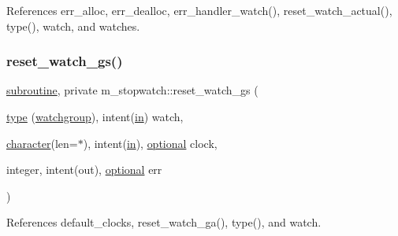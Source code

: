 References err\+\_\+alloc, err\+\_\+dealloc, err\+\_\+handler\+\_\+watch(), reset\+\_\+watch\+\_\+actual(), type(), watch, and watches.

\mbox{\label{namespacem__stopwatch_a9044e009bd733b8a19724839001c496f}} 
\subsubsection{\texorpdfstring{reset\+\_\+watch\+\_\+gs()}{reset\_watch\_gs()}}
{\footnotesize\ttfamily \hyperlink{M__stopwatch_83_8txt_acfbcff50169d691ff02d4a123ed70482}{subroutine}, private m\+\_\+stopwatch\+::reset\+\_\+watch\+\_\+gs (\begin{DoxyParamCaption}\item[{\hyperlink{stop__watch_83_8txt_a70f0ead91c32e25323c03265aa302c1c}{type} (\hyperlink{structm__stopwatch_1_1watchgroup}{watchgroup}), intent(\hyperlink{M__journal_83_8txt_afce72651d1eed785a2132bee863b2f38}{in})}]{watch,  }\item[{\hyperlink{option__stopwatch_83_8txt_abd4b21fbbd175834027b5224bfe97e66}{character}(len=$\ast$), intent(\hyperlink{M__journal_83_8txt_afce72651d1eed785a2132bee863b2f38}{in}), \hyperlink{option__stopwatch_83_8txt_aa4ece75e7acf58a4843f70fe18c3ade5}{optional}}]{clock,  }\item[{integer, intent(out), \hyperlink{option__stopwatch_83_8txt_aa4ece75e7acf58a4843f70fe18c3ade5}{optional}}]{err }\end{DoxyParamCaption})\hspace{0.3cm}{\ttfamily [private]}}



References default\+\_\+clocks, reset\+\_\+watch\+\_\+ga(), type(), and watch.

\mbox{\label{namespacem__stopwatch_a845b765415e8f229b7f3251a96eaccc6}} 
